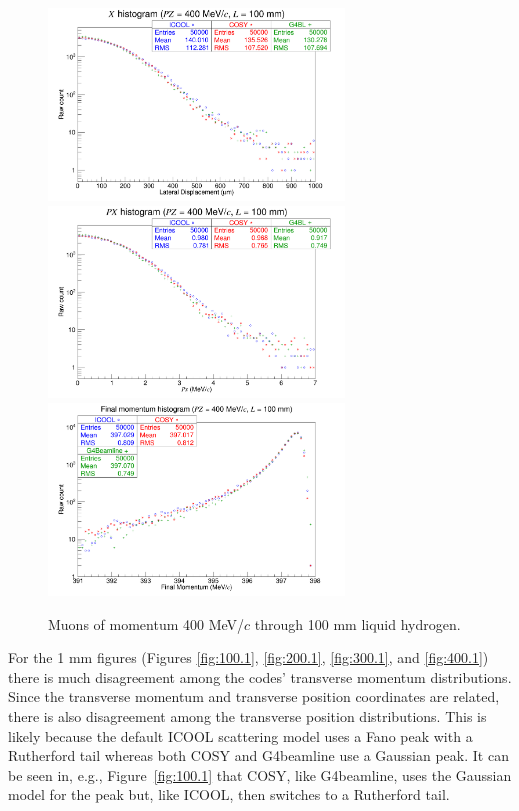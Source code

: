 \begin{figure}[H]
  \centering
    \includegraphics[width=0.7\textwidth]{Benchmarking/LH/X.400.100.png} 
    \includegraphics[width=0.7\textwidth]{Benchmarking/LH/PX.400.100.png} 
    \includegraphics[width=0.7\textwidth]{Benchmarking/LH/strag.400.100.png} 
  \caption{Muons of momentum 400 MeV/$c$ through 100 mm liquid hydrogen.}
  \label{fig:400.100}
\end{figure}


For the 1 mm figures (Figures \ref{fig:100.1}, \ref{fig:200.1}, \ref{fig:300.1}, and \ref{fig:400.1}) there is much disagreement among the codes' transverse momentum distributions. Since the transverse momentum and transverse position coordinates are related, there is also disagreement among the transverse position distributions. This is likely because the default ICOOL scattering model uses a Fano peak with a Rutherford tail whereas both COSY and G4beamline use a Gaussian peak. It can be seen in, e.g., Figure~\ref{fig:100.1} that COSY, like G4beamline, uses the Gaussian model for the peak but, like ICOOL, then switches to a Rutherford tail.

